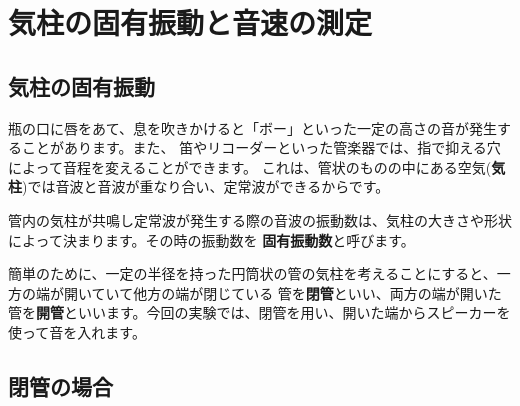%
%


\section{気柱の固有振動と音速の測定}

\subsection{気柱の固有振動}

瓶の口に唇をあて、息を吹きかけると「ボー」といった一定の高さの音が発生することがあります。また、
笛やリコーダーといった管楽器では、指で抑える穴によって音程を変えることができます。
これは、管状のものの中にある空気({\bf 気柱})では音波と音波が重なり合い、定常波ができるからです。

管内の気柱が共鳴し定常波が発生する際の音波の振動数は、気柱の大きさや形状によって決まります。その時の振動数を
{\bf 固有振動数}と呼びます。

簡単のために、一定の半径を持った円筒状の管の気柱を考えることにすると、一方の端が開いていて他方の端が閉じている
管を{\bf 閉管}といい、両方の端が開いた管を{\bf 開管}といいます。今回の実験では、閉管を用い、開いた端からスピーカーを
使って音を入れます。

\subsection{閉管の場合}

